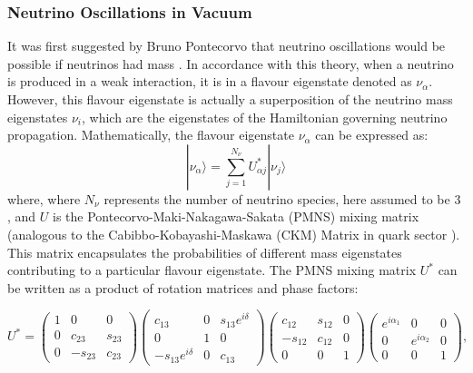 \subsubsection*{Neutrino Oscillations in Vacuum}
\label{sec:nu_osc_vacuum}
It was first suggested by Bruno Pontecorvo that neutrino oscillations would be possible if neutrinos had mass . In accordance with this theory, when a neutrino is produced in a weak interaction, it is in a flavour eigenstate denoted as $\nu_{\alpha}$. However, this flavour eigenstate is actually a superposition of the neutrino mass eigenstates $\nu_{i}$, which are the eigenstates of the Hamiltonian governing neutrino propagation. Mathematically, the flavour eigenstate $\nu_{\alpha}$ can be expressed as:
\begin{equation}\label{eq:flav_to_mass}
        |\nu_{\alpha}\rangle = \sum_{j=1}^{N_{\nu}} U_{\alpha j}^* |\nu_j\rangle
\end{equation}
where, where $N_{\nu}$  represents the number of neutrino species, here assumed to be 3 , and $U$ is the Pontecorvo-Maki-Nakagawa-Sakata (PMNS) mixing matrix (analogous to the Cabibbo-Kobayashi-Maskawa (CKM) Matrix in quark sector ). This matrix encapsulates the probabilities of different mass eigenstates contributing to a particular flavour eigenstate. 
The PMNS mixing matrix $U^*$ can be written as a product of rotation matrices and phase factors:

\begin{equation*}\label{eq:pmns}
U^{*} = \begin{pmatrix}
1 & 0 & 0 \\
0 & c_{23} & s_{23} \\
0 & -s_{23} & c_{23} 
\end{pmatrix}
\begin{pmatrix}
c_{13} & 0 & s_{13} e^{i\delta} \\
0 & 1 & 0 \\
-s_{13} e^{i\delta} & 0 & c_{13} 
\end{pmatrix}
\begin{pmatrix}
c_{12} & s_{12} & 0 \\
-s_{12} & c_{12} & 0 \\
0 & 0 & 1
\end{pmatrix}
\begin{pmatrix}
e^{i\alpha_1} & 0 & 0 \\
0 & e^{i\alpha_2} & 0 \\
0 & 0 & 1
\end{pmatrix},
\end{equation*}

